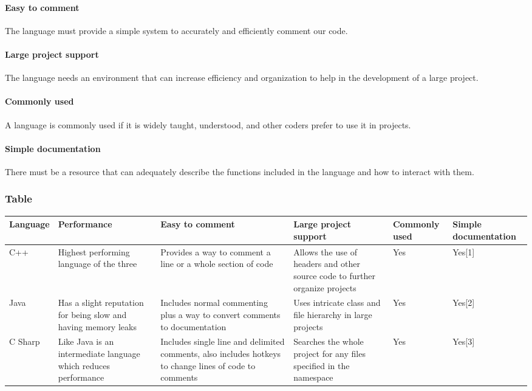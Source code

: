 \documentclass[10pt,letterpaper,onecolumn,draftclsnofoot]{IEEEtran}
\begin{document}
\paragraph{Easy to comment}
The language must provide a simple system to accurately and efficiently comment our code.

\paragraph{Large project support}
The language needs an environment that can increase efficiency and organization to help in the development of a large project.

\paragraph{Commonly used}
A language is commonly used if it is widely taught, understood, and other coders prefer to use it in projects.

\paragraph{Simple documentation}
There must be a resource that can adequately describe the functions included in the language and how to interact with them.

\subsubsection{Table}
\begin{center}
\begin{tabular}{ ||B|M|M|M|M|M|| } 
\hline
Language & Performance & Easy to comment & Large project support & Commonly used & Simple documentation\\
 \hline
 C++ & Highest performing language of the three & Provides a way to comment a line or a whole section of code & Allows the use of headers and other source code to further organize projects & Yes & Yes[1]\\ 
 \hline
 Java & Has a slight reputation for being slow and having memory leaks & Includes normal commenting plus a way to convert comments to documentation & Uses intricate class and file hierarchy in large projects & Yes & Yes[2]\\ 
 \hline
 C Sharp & Like Java is an intermediate language which reduces performance & Includes single line and delimited comments, also includes hotkeys to change lines of code to comments & Searches the whole project for any files specified in the namespace & Yes & Yes[3]\\ 
 \hline
\end{tabular}
\end{center}
\end{document}
